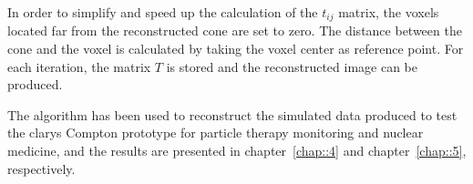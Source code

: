 In order to simplify and speed up the calculation of the $t_{ij}$ matrix, the voxels located far from the reconstructed cone are set to zero. The distance between the cone and the voxel is calculated by taking the voxel center as reference point. 
For each iteration, the matrix $T$ is stored and the reconstructed image can be produced.

The algorithm has been used to reconstruct the simulated data produced to test the \gls{clarys} Compton prototype for particle therapy monitoring and nuclear medicine, and the results are presented in chapter~\ref{chap::4} and chapter~\ref{chap::5}, respectively. 



\clearpage
